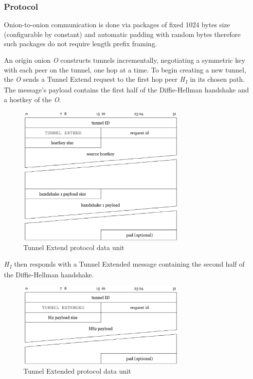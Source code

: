\documentclass{article}
\begin{document}
\subsubsection{Protocol}

Onion-to-onion communication is done via packages of fixed 1024 bytes size (configurable by constant) and automatic padding with random bytes therefore such packages do not require length prefix framing.

An origin onion \textit{O} constructs tunnels incrementally, negotiating a symmetric key with each peer on the tunnel, one hop at a time. To begin creating a new tunnel, the \textit{O} sends a Tunnel Extend request to the first hop peer \textit{H\textsubscript{1}} in its chosen path. The message's payload contains the first half of the Diffie-Hellman handshake and a hostkey of the \textit{O}.

\begin{figure}[H]
\centering
     \includegraphics[width=0.75\textwidth]{tunnel-extend.pdf}
      \caption{Tunnel Extend protocol data unit}
\end{figure}

\textit{H\textsubscript{1}} then responds with a Tunnel Extended message containing the second half of the Diffie-Hellman handshake.
\begin{figure}[H]
\centering
     \includegraphics[width=0.75\textwidth]{tunnel-extended.pdf}
      \caption{Tunnel Extended protocol data unit}
\end{figure}
\end{document}
